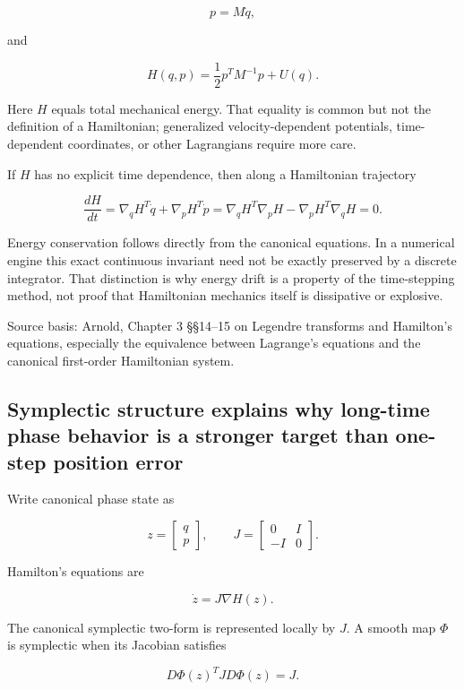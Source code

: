 \[
p=M\dot q,
\]

and

\[
H(q,p)
=
\frac12p^TM^{-1}p+U(q).
\]

Here \(H\) equals total mechanical energy. That equality is common but not the definition of a Hamiltonian; generalized velocity-dependent potentials, time-dependent coordinates, or other Lagrangians require more care.

If \(H\) has no explicit time dependence, then along a Hamiltonian trajectory

\[
\frac{dH}{dt}
=
\nabla_qH^T\dot q
+
\nabla_pH^T\dot p
=
\nabla_qH^T\nabla_pH
-
\nabla_pH^T\nabla_qH
=
0.
\]

Energy conservation follows directly from the canonical equations. In a numerical engine this exact continuous invariant need not be exactly preserved by a discrete integrator. That distinction is why energy drift is a property of the time-stepping method, not proof that Hamiltonian mechanics itself is dissipative or explosive.

Source basis: Arnold, Chapter 3 §§14--15 on Legendre transforms and Hamilton's equations, especially the equivalence between Lagrange's equations and the canonical first-order Hamiltonian system.

\subsection{Symplectic structure explains why long-time phase behavior is a stronger target than one-step position error}\label{06-engine-ii-ch033-symplectic-structure-explains-why-long-time-phase-behavior-is-a-stronger-target-than-one-step-position-error}

Write canonical phase state as

\[
z=
\begin{bmatrix}
q\\p
\end{bmatrix},
\qquad
J=
\begin{bmatrix}
0&I\\
-I&0
\end{bmatrix}.
\]

Hamilton's equations are

\[
\dot z
=
J\nabla H(z).
\]

The canonical symplectic two-form is represented locally by \(J\). A smooth map \(\Phi\) is symplectic when its Jacobian satisfies

\[
D\Phi(z)^T J D\Phi(z)=J.
\]

